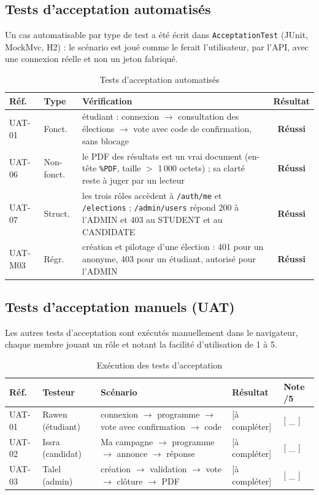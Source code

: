 \documentclass[12pt,a4paper]{report}
\newcommand{\ok}{\textcolor{okgreen}{\textbf{Réussi}}}
\begin{document}
\subsection{Tests d'acceptation automatisés}\label{sec:uat-auto}
Un cas automatisable par type de test a été écrit dans \texttt{AcceptationTest} (JUnit, MockMvc, H2) : le scénario est joué comme le ferait l'utilisateur, par l'API, avec une connexion réelle et non un jeton fabriqué.
\begin{table}[H]
\centering
\caption{Tests d'acceptation automatisés}
\small
\begin{tabularx}{\textwidth}{@{}lp{1.9cm}Xc@{}}
\toprule
\rowcolor{evlight}\textbf{Réf.} & \textbf{Type} & \textbf{Vérification} & \textbf{Résultat}\\
\midrule
UAT-01 & Fonct. & étudiant : connexion $\rightarrow$ consultation des élections $\rightarrow$ vote avec code de confirmation, sans blocage & \ok\\
UAT-06 & Non-fonct. & le PDF des résultats est un vrai document (en-tête \texttt{\%PDF}, taille $>$ 1\,000 octets) ; sa clarté reste à juger par un lecteur & \ok\\
UAT-07 & Struct. & les trois rôles accèdent à \texttt{/auth/me} et \texttt{/elections} ; \texttt{/admin/users} répond 200 à l'ADMIN et 403 au STUDENT et au CANDIDATE & \ok\\
UAT-M03 & Régr. & création et pilotage d'une élection : 401 pour un anonyme, 403 pour un étudiant, autorisé pour l'ADMIN & \ok\\
\bottomrule
\end{tabularx}
\end{table}

\subsection{Tests d'acceptation manuels (UAT)}
Les autres tests d'acceptation sont exécutés manuellement dans le navigateur, chaque membre jouant un rôle et notant la facilité d'utilisation de 1 à 5.
\begin{table}[H]
\centering
\caption{Exécution des tests d'acceptation}
\small
\begin{tabularx}{\textwidth}{@{}lp{2.2cm}Xp{1.8cm}p{1.4cm}@{}}
\toprule
\rowcolor{evlight}\textbf{Réf.} & \textbf{Testeur} & \textbf{Scénario} & \textbf{Résultat} & \textbf{Note /5}\\
\midrule
UAT-01 & Rawen (étudiant) & connexion $\rightarrow$ programme $\rightarrow$ vote avec confirmation $\rightarrow$ code & [à compléter] & [ \_ ]\\
UAT-02 & Issra (candidat) & Ma campagne $\rightarrow$ programme $\rightarrow$ annonce $\rightarrow$ réponse & [à compléter] & [ \_ ]\\
UAT-03 & Talel (admin) & création $\rightarrow$ validation $\rightarrow$ vote $\rightarrow$ clôture $\rightarrow$ PDF & [à compléter] & [ \_ ]\\
\bottomrule
\end{tabularx}
\end{table}
\end{document}
